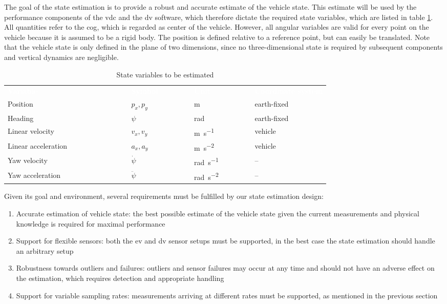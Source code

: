 The goal of the state estimation is to provide a robust and accurate estimate of the vehicle state. This estimate will be used by the performance components of the \gls{vdc} and the \gls{dv} software, which therefore dictate the required state variables, which are listed in table \ref{tab:state-variables}. All quantities refer to the \gls{cog}, which is regarded as center of the vehicle. However, all angular variables are valid for every point on the vehicle because it is assumed to be a rigid body. The position is defined relative to a reference point, but can easily be translated. Note that the vehicle state is only defined in the plane of two dimensions, since no three-dimensional state is required by subsequent components and vertical dynamics are negligible.

\begin{table}
	\newcommand\heading[1]{\textcolor{white}{\textbf{#1}}}
	\renewcommand{\arraystretch}{1.2}
	\sffamily
	\centering
	\begin{tabularx}{\textwidth}{l l l X}
	\rowcolor{black} \heading{Variable~~~~~~~~~~~~~~~~~~~~~} & \heading{Symbol~~~~~~~} & \heading{Unit~~~~~~~~~} & \heading{Coordinate system} \vspace{2pt} \\
	Position & $p_x, p_y$ & \si{\meter} & earth-fixed \\
	Heading & $\psi$ & \si{\radian} & earth-fixed \\
	Linear velocity & $v_x, v_y$ & \si{\meter\per\second} & vehicle \\
	Linear acceleration & $a_x, a_y$ & \si{\meter\per\square\second} & vehicle \\
	Yaw velocity & $\dot{\psi}$ & \si{\radian\per\second} & -- \\
	Yaw acceleration & $\ddot{\psi}$ & \si{\radian\per\square\second} & -- \\
	\end{tabularx}
	\caption{State variables to be estimated}
	\label{tab:state-variables}
\end{table}

Given its goal and environment, several requirements must be fulfilled by our state estimation design:
\begin{enumerate}
\item Accurate estimation of vehicle state: the best possible estimate of the vehicle state given the current measurements and physical knowledge is required for maximal performance
\item Support for flexible sensors: both the \gls{ev} and \gls{dv} sensor setups must be supported, in the best case the state estimation should handle an arbitrary setup
\item Robustness towards outliers and failures: outliers and sensor failures may occur at any time and should not have an adverse effect on the estimation, which requires detection and appropriate handling
\item Support for variable sampling rates: measurements arriving at different rates must be supported, as mentioned in the previous section
\end{enumerate}


